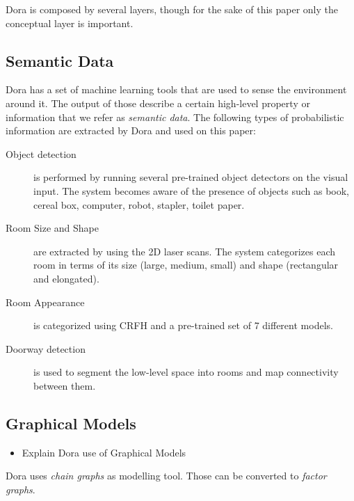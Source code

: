 \documentclass[runningheads,a4paper]{llncs}
\begin{document}
Dora is composed by several layers, though for the sake of this paper only the conceptual layer is important.

\subsection{Semantic Data}
Dora has a set of machine learning tools that are used to sense the environment around it.
The output of those describe a certain high-level property or information that we refer as \emph{semantic data}.
The following types of probabilistic information are extracted by Dora and used on this paper:
\begin{description}
\item[Object detection] is performed by running several pre-trained object detectors on the visual input. The system becomes
aware of the presence of objects such as book, cereal box, computer, robot, stapler, toilet paper.

\item[Room Size and Shape] are extracted by using the 2D laser scans. The system categorizes each room in terms of its size (large, medium, small) and shape (rectangular and elongated).

\item[Room Appearance] is categorized using CRFH and a pre-trained set of 7 different models.

\item[Doorway detection] is used to segment the low-level space into rooms and map connectivity between them.
\end{description}

\subsection{Graphical Models}
\begin{itemize}
\item Explain Dora use of Graphical Models
\end{itemize}

Dora uses \emph{chain graphs} as modelling tool. Those can be converted to \emph{factor graphs}\cite{factor}.
\end{document}
